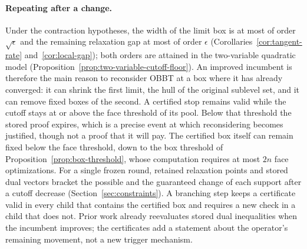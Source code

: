 \paragraph{Repeating after a change.} Under the contraction hypotheses, the
width of the limit box is at most of order $\sqrt\epsilon$ and the
remaining relaxation gap at most of order $\epsilon$
(Corollaries~\ref{cor:tangent-rate} and~\ref{cor:local-gap}); both orders
are attained in the two-variable quadratic model
(Proposition~\ref{prop:two-variable-cutoff-floor}). An improved incumbent is
therefore the main reason to reconsider OBBT at a box where it has already
converged: it can shrink the first limit, the hull of the original sublevel
set, and it can remove fixed boxes of the second. A certified stop remains
valid while the cutoff stays at or above the face threshold of its pool.
Below that threshold the stored proof expires, which is a precise event at
which reconsidering becomes justified, though not a proof that it will pay.
The certified box itself can remain fixed below the face threshold, down to
the box threshold of Proposition~\ref{prop:box-threshold}, whose computation
requires at most $2n$ face optimizations. For a single frozen round, retained relaxation
points and stored dual vectors bracket the possible and the guaranteed
change of each support after a cutoff decrease
(Section~\ref{sec:constraints}). A branching step keeps a certificate valid
in every child that contains the certified box and requires a new check in a
child that does not. Prior work already reevaluates stored dual
inequalities when the incumbent improves; the certificates add a statement
about the operator's remaining movement, not a new trigger mechanism.

